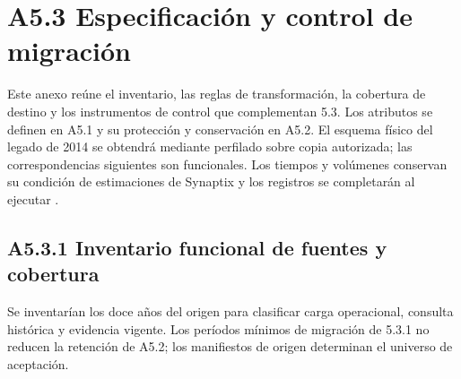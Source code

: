 \section*{A5.3 Especificación y control de migración}

\label{anx:sd5_migracion}

Este anexo reúne el inventario, las reglas de transformación, la cobertura de destino y los instrumentos de control que complementan 5.3. Los atributos se definen en A5.1 y su protección y conservación en A5.2. El esquema físico del legado de 2014 se obtendrá mediante perfilado sobre copia autorizada; las correspondencias siguientes son funcionales. Los tiempos y volúmenes conservan su condición de estimaciones de Synaptix y los registros se completarán al ejecutar \parencites[RT-05.11--RT-05.15]{pucv-bases-transversales}[RT-05.15]{pucv-caso07}[anexo A2.3, DEC-02]{synaptix-sd2-anexos}.

\subsection*{A5.3.1 Inventario funcional de fuentes y cobertura}

Se inventarían los doce años del origen para clasificar carga operacional, consulta histórica y evidencia vigente. Los períodos mínimos de migración de 5.3.1 no reducen la retención de A5.2; los manifiestos de origen determinan el universo de aceptación.

